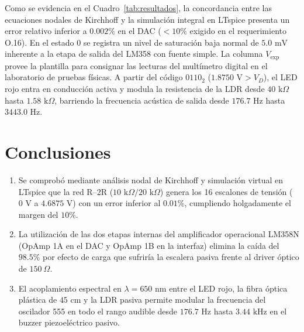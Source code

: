 \documentclass[journal,transmag]{IEEEtran}
\begin{document}
Como se evidencia en el Cuadro~\ref{tab:resultados}, la concordancia entre las ecuaciones nodales de Kirchhoff y la simulación integral en LTspice presenta un error relativo inferior a $0.002\%$ en el DAC ($< 10\%$ exigido en el requerimiento O.16). En el estado 0 se registra un nivel de saturación baja normal de $5.0\text{ mV}$ inherente a la etapa de salida del LM358 con fuente simple. La columna $V_{\text{exp}}$ provee la plantilla para consignar las lecturas del multímetro digital en el laboratorio de pruebas físicas. A partir del código $0110_2$ ($1.8750\text{ V} > V_D$), el LED rojo entra en conducción activa y modula la resistencia de la LDR desde $40\text{ k}\Omega$ hasta $1.58\text{ k}\Omega$, barriendo la frecuencia acústica de salida desde $176.7\text{ Hz}$ hasta $3443.0\text{ Hz}$.

\section{Conclusiones}
\begin{enumerate}
\item Se comprobó mediante análisis nodal de Kirchhoff y simulación virtual en LTspice que la red R--2R ($10\text{ k}\Omega / 20\text{ k}\Omega$) genera los 16 escalones de tensión ($0\text{ V}$ a $4.6875\text{ V}$) con un error inferior al $0.01\%$, cumpliendo holgadamente el margen del $10\%$.
\item La utilización de las dos etapas internas del amplificador operacional LM358N (OpAmp 1A en el DAC y OpAmp 1B en la interfaz) elimina la caída del $98.5\%$ por efecto de carga que sufriría la escalera pasiva frente al driver óptico de $150\ \Omega$.
\item El acoplamiento espectral en $\lambda = 650\text{ nm}$ entre el LED rojo, la fibra óptica plástica de $45\text{ cm}$ y la LDR pasiva permite modular la frecuencia del oscilador 555 en todo el rango audible desde $176.7\text{ Hz}$ hasta $3.44\text{ kHz}$ en el buzzer piezoeléctrico pasivo.
\end{enumerate}
\end{document}
